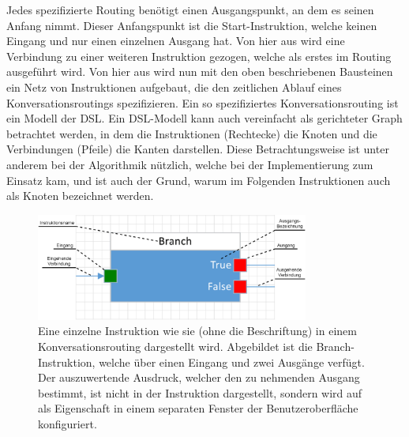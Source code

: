 \newline
Jedes spezifizierte Routing benötigt einen Ausgangspunkt, an dem es seinen Anfang nimmt. Dieser Anfangspunkt ist die Start-Instruktion, welche keinen Eingang und nur einen einzelnen Ausgang hat. Von hier aus wird eine Verbindung zu einer weiteren Instruktion gezogen, welche als erstes im Routing ausgeführt wird. Von hier aus wird nun mit den oben beschriebenen Bausteinen ein Netz von Instruktionen aufgebaut, die den zeitlichen Ablauf eines Konversationsroutings spezifizieren. Ein so spezifiziertes Konversationsrouting ist ein Modell der DSL.
\newline
Ein DSL-Modell kann auch vereinfacht als gerichteter Graph betrachtet werden, in dem die Instruktionen (Rechtecke) die Knoten und die Verbindungen (Pfeile) die Kanten darstellen. Diese Betrachtungsweise ist unter anderem bei der Algorithmik nützlich, welche bei der Implementierung zum Einsatz kam, und ist auch der Grund, warum im Folgenden Instruktionen auch als Knoten bezeichnet werden. 

\begin{figure} %
	\centering
		\includegraphics[width=0.8\textwidth]{img/SingleNodeWithAnnotations.png}
	\caption[Beschriftung einer DSL-Instruktion]{Eine einzelne Instruktion wie sie (ohne die Beschriftung) in einem Konversationsrouting dargestellt wird. Abgebildet ist die Branch-Instruktion, welche über einen Eingang und zwei Ausgänge verfügt. Der auszuwertende Ausdruck, welcher den zu nehmenden Ausgang bestimmt, ist nicht in der Instruktion dargestellt, sondern wird auf als Eigenschaft in einem separaten Fenster der Benutzeroberfläche konfiguriert.}
	\label{fig:SingleNode}
\end{figure}

